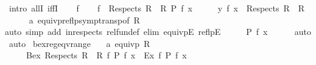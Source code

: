 \begin{isabellebody}
%
\isadelimproof
%
\endisadelimproof
%
\isatagproof
{}\isamarkupfalse%
\ {\isacharparenleft}{\kern0pt}intro\ allI\ iffI{\isacharparenright}{\kern0pt}\isanewline
\ \ \isamarkupfalse%
\ f\isanewline
\ \ \isamarkupfalse%
\ {\isachardoublequoteopen}{\isasymforall}f\ {\isasymin}\ Respects\ {\isacharparenleft}{\kern0pt}R{}\ {\isacharequal}{\kern0pt}{\isacharequal}{\kern0pt}{\isacharequal}{\kern0pt}{\isachargreater}{\kern0pt}\ R{}{\isacharparenright}{\kern0pt}{\isachardot}{\kern0pt}\ P\ {\isacharparenleft}{\kern0pt}f\ x{\isacharparenright}{\kern0pt}{\isachardoublequoteclose}\isanewline
\ \ \isamarkupfalse%
\ \isamarkupfalse%
\ {\isachardoublequoteopen}{\isacharparenleft}{\kern0pt}{\isasymlambda}y{\isachardot}{\kern0pt}\ f\ x{\isacharparenright}{\kern0pt}\ {\isasymin}\ Respects\ {\isacharparenleft}{\kern0pt}R{}\ {\isacharequal}{\kern0pt}{\isacharequal}{\kern0pt}{\isacharequal}{\kern0pt}{\isachargreater}{\kern0pt}\ R{}{\isacharparenright}{\kern0pt}{\isachardoublequoteclose}\isanewline
\ \ \ \ \isamarkupfalse%
\ a\ equivp{\isacharunderscore}{\kern0pt}reflp{\isacharunderscore}{\kern0pt}symp{\isacharunderscore}{\kern0pt}transp{\isacharbrackleft}{\kern0pt}of\ {\isachardoublequoteopen}R{}{\isachardoublequoteclose}{\isacharbrackright}{\kern0pt}\isanewline
\ \ \ \ \isamarkupfalse%
{\isacharparenleft}{\kern0pt}auto\ simp\ add{\isacharcolon}{\kern0pt}\ in{\isacharunderscore}{\kern0pt}respects\ rel{\isacharunderscore}{\kern0pt}fun{\isacharunderscore}{\kern0pt}def\ elim{\isacharcolon}{\kern0pt}\ equivpE\ reflpE{\isacharparenright}{\kern0pt}\isanewline
\ \ \isamarkupfalse%
\ \isamarkupfalse%
\ {\isachardoublequoteopen}P\ {\isacharparenleft}{\kern0pt}f\ x{\isacharparenright}{\kern0pt}{\isachardoublequoteclose}\isanewline
\ \ \ \ \isamarkupfalse%
\ auto\isanewline
{}\isamarkupfalse%
\ auto%
\endisatagproof
{\isafoldproof}%
%
\isadelimproof
\isanewline
%
\endisadelimproof
\isanewline
{}\isamarkupfalse%
\ bex{\isacharunderscore}{\kern0pt}reg{\isacharunderscore}{\kern0pt}eqv{\isacharunderscore}{\kern0pt}range{\isacharcolon}{\kern0pt}\isanewline
\ \ \ a{\isacharcolon}{\kern0pt}\ {\isachardoublequoteopen}equivp\ R{}{\isachardoublequoteclose}\isanewline
\ \ \ \ \ {\isachardoublequoteopen}{\isacharparenleft}{\kern0pt}Bex\ {\isacharparenleft}{\kern0pt}Respects\ {\isacharparenleft}{\kern0pt}R{}\ {\isacharequal}{\kern0pt}{\isacharequal}{\kern0pt}{\isacharequal}{\kern0pt}{\isachargreater}{\kern0pt}\ R{}{\isacharparenright}{\kern0pt}{\isacharparenright}{\kern0pt}\ {\isacharparenleft}{\kern0pt}{\isasymlambda}f{\isachardot}{\kern0pt}\ P\ {\isacharparenleft}{\kern0pt}f\ x{\isacharparenright}{\kern0pt}{\isacharparenright}{\kern0pt}\ {\isacharequal}{\kern0pt}\ Ex\ {\isacharparenleft}{\kern0pt}{\isasymlambda}f{\isachardot}{\kern0pt}\ P\ {\isacharparenleft}{\kern0pt}f\ x{\isacharparenright}{\kern0pt}{\isacharparenright}{\kern0pt}{\isacharparenright}{\kern0pt}{\isachardoublequoteclose}\isanewline

\end{isabellebody}
